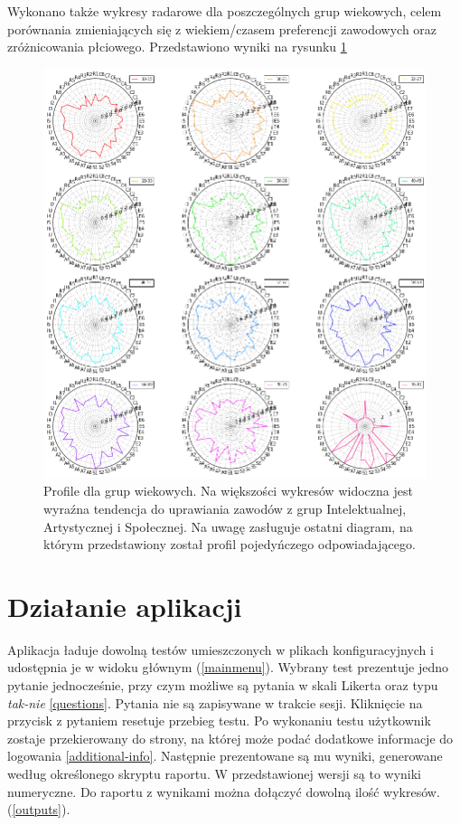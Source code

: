 \documentclass[12pt,a4paper,oneside]{report} %
\begin{document}
Wykonano także wykresy radarowe dla poszczególnych grup wiekowych, celem porównania zmieniających się z wiekiem/czasem 
preferencji zawodowych oraz zróżnicowania płciowego. Przedstawiono wyniki na rysunku \ref{profile} \par

\begin{figure}
\centering
\includegraphics[width=1\textwidth]{profile.png}
\caption[Profile dla grup wiekowych]{Profile dla grup wiekowych. Na większości wykresów widoczna jest wyraźna tendencja do uprawiania zawodów z grup Intelektualnej, Artystycznej i Społecznej. Na uwagę zasługuje ostatni diagram, na którym przedstawiony został profil pojedyńczego odpowiadającego.\label{profile}}
\end{figure}

\section{Działanie aplikacji}

Aplikacja ładuje dowolną testów umieszczonych w plikach konfiguracyjnych i udostępnia je w widoku głównym (\ref{mainmenu}). Wybrany test prezentuje jedno pytanie jednocześnie, przy czym możliwe są pytania w skali Likerta oraz typu \emph{tak-nie} \ref{questions}. Pytania nie są zapisywane w trakcie sesji. Kliknięcie na przycisk z pytaniem resetuje przebieg testu.  Po wykonaniu testu użytkownik zostaje przekierowany do strony, na której może podać dodatkowe informacje do logowania \ref{additional-info}. Następnie prezentowane są mu wyniki, generowane według określonego skryptu raportu. W przedstawionej wersji są to wyniki numeryczne. Do raportu z wynikami można dołączyć dowolną ilość wykresów. (\ref{outputs}). \par
\end{document}
